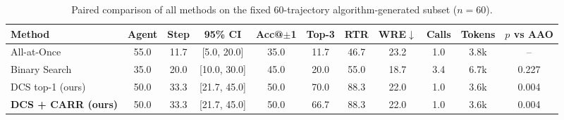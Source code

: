 \begin{table}[t]
\centering
\caption{Paired comparison of all methods on the fixed 60-trajectory algorithm-generated subset ($n=60$).}
\label{tab:main_sub}
\footnotesize
\setlength{\tabcolsep}{4pt}
\begin{tabular}{@{}lcccccccccc@{}}
\toprule
Method & Agent & Step & 95\% CI & Acc@$\pm$1 & Top-3 & RTR & WRE$\downarrow$ & Calls & Tokens & $p$ vs AAO \\
\midrule
All-at-Once~\cite{zhang2025whowhen} & 55.0 & 11.7 & [5.0, 20.0] & 35.0 & 11.7 & 46.7 & 23.2 & 1.0 & 3.8k & -- \\
Binary Search~\cite{zhang2025whowhen} & 35.0 & 20.0 & [10.0, 30.0] & 45.0 & 20.0 & 55.0 & 18.7 & 3.4 & 6.7k & 0.227 \\
DCS top-1 (ours) & 50.0 & 33.3 & [21.7, 45.0] & 50.0 & 70.0 & 88.3 & 22.0 & 1.0 & 3.6k & 0.004 \\
\textbf{DCS + CARR (ours)} & 50.0 & 33.3 & [21.7, 45.0] & 50.0 & 66.7 & 88.3 & 22.0 & 1.0 & 3.6k & 0.004 \\
\bottomrule
\end{tabular}
\end{table}